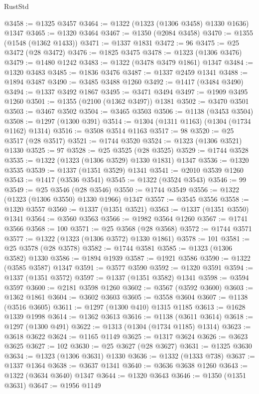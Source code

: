 \begin{lexlean}{RustStd}
\begin{coremodule}
@3458 := @1325 @3457
@3464 := @1322 (@1323 (@1306 @3458) @1330 @1636) @1347
@3465 := @1320 @3464
@3467 := @1350 (@2084 @3458)
@3470 := @1355 (@1548 (@1362 @1433))
@3471 := @1337 @1831
@3472 := 96
@3475 := @25 @3472 (@28 @3472)
@3476 := @1825 @3475
@3478 := @1323 (@1306 @3476)
@3479 := @1480 @1242
@3483 := @1322 (@3478 @3479 @1861) @1347
@3484 := @1320 @3483
@3485 := @1836 @3476
@3487 := @1337 @2459 @1341
@3488 := @1894 @3487
@3490 := @3485 @3488 @1260
@3492 := @1417 (@3484 @3490)
@3494 := @1337 @3492 @1867
@3495 := @3471 @3494
@3497 := @1909 @3495 @1260
@3501 := @1355 (@2100 (@1362 @3497)) @1381
@3502 := @3470 @3501
@3503 := @3467 @3502
@3504 := @3465 @3503
@3506 := @1138 (@3453 @3504)
@3508 := @1297 (@1300 @391)
@3514 := @1304 (@1311 @1163) (@1304 (@1734 @1162) @1314)
@3516 := @3508 @3514 @1163
@3517 := 98
@3520 := @25 @3517 (@28 @3517)
@3521 := @1744 @3520
@3524 := @1323 (@1306 @3521) @1330
@3525 := 97
@3528 := @25 @3525 (@28 @3525)
@3529 := @1744 @3528
@3535 := @1322 (@1323 (@1306 @3529) @1330 @1831) @1347
@3536 := @1320 @3535
@3539 := @1337 (@1351 @3529) @1341
@3541 := @2010 @3539 @1260
@3543 := @1417 (@3536 @3541)
@3545 := @1322 (@3524 @3543)
@3546 := 99
@3549 := @25 @3546 (@28 @3546)
@3550 := @1744 @3549
@3556 := @1322 (@1323 (@1306 @3550) @1330 @1966) @1347
@3557 := @3545 @3556
@3558 := @1320 @3557
@3560 := @1337 (@1351 @3521)
@3563 := @1337 (@1351 @3550) @1341
@3564 := @3560 @3563
@3566 := @1982 @3564 @1260
@3567 := @1741 @3566
@3568 := 100
@3571 := @25 @3568 (@28 @3568)
@3572 := @1744 @3571
@3577 := @1322 (@1323 (@1306 @3572) @1330 @1861)
@3578 := 101
@3581 := @25 @3578 (@28 @3578)
@3582 := @1744 @3581
@3585 := @1323 (@1306 @3582) @1330
@3586 := @1894 @1939
@3587 := @1921 @3586
@3590 := @1322 (@3585 @3587) @1347
@3591 := @3577 @3590
@3592 := @1320 @3591
@3594 := @1337 (@1351 @3572)
@3597 := @1337 (@1351 @3582) @1341
@3598 := @3594 @3597
@3600 := @2181 @3598 @1260
@3602 := @3567 (@3592 @3600)
@3603 := @1362 @1861
@3604 := @3602 @3603
@3605 := @3558 @3604
@3607 := @1138 (@3516 @3605)
@3611 := @1297 (@1300 @410) @1315 @1185
@3613 := @1628 @1339 @1998
@3614 := @1362 @3613
@3616 := @1138 (@3611 @3614)
@3618 := @1297 (@1300 @491)
@3622 := @1313 (@1304 (@1734 @1185) @1314)
@3623 := @3618 @3622
@3624 := @1165 @1149
@3625 := @1317 @3624
@3626 := @3623 @3625
@3627 := 102
@3630 := @25 @3627 (@28 @3627)
@3631 := @1325 @3630
@3634 := @1323 (@1306 @3631) @1330
@3636 := @1332 (@1333 @738)
@3637 := @1337 @1364
@3638 := @3637 @1341
@3640 := @3636 @3638 @1260
@3643 := @1322 (@3634 @3640) @1347
@3644 := @1320 @3643
@3646 := @1350 (@1351 @3631)
@3647 := @1956 @1149

\end{coremodule}
\end{lexlean}
